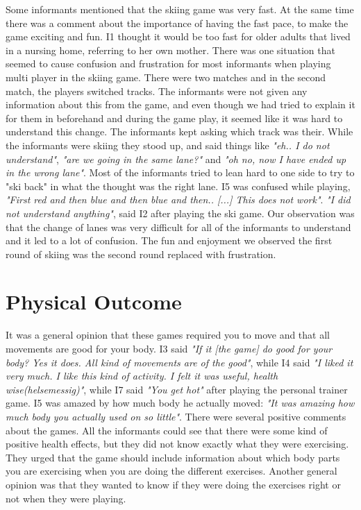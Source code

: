 Some informants mentioned that the skiing game was very fast. At the same time there was a comment about the importance of having the fast pace, to make the game exciting and fun. I1 thought it would be too fast for older adults that lived in a nursing home, referring to her own mother. There was one situation that seemed to cause confusion and frustration for most informants when playing multi player in the skiing game. There were two matches and in the second match, the players switched tracks. The informants were not given any information about this from the game, and even though we had tried to explain it for them in beforehand and during the game play, it seemed like it was hard to understand this change. The informants kept asking which track was their. While the informants were skiing they stood up, and said things like \emph{"eh.. I do not understand"}, \emph{"are we going in the same lane?"} and \emph{"oh no, now I have ended up in the wrong lane"}. Most of the informants tried to lean hard to one side to try to "ski back" in what the thought was the right lane. I5 was confused while playing, \emph{"First red and then blue and then blue and then.. [...] This does not work"}. \emph{"I did not understand anything"}, said I2 after playing the ski game. Our observation was that the change of lanes was very difficult for all of the informants to understand and it led to a lot of confusion. The fun and enjoyment we observed the first round of skiing was the second round replaced with frustration. 

\section{Physical Outcome}

It was a general opinion that these games required you to move and that all movements are good for your body. I3 said \emph{"If it [the game] do good for your body? Yes it does. All kind of movements are of the good"}, while I4 said  \emph{"I liked it very much. I like this kind of activity. I felt it was useful, health wise(helsemessig)"}, while I7 said \emph{"You get hot"} after playing the personal trainer game. I5 was amazed by how much body he actually moved: \emph{"It was amazing how much body you actually used on so little"}. There were several positive comments about the games. All the informants could see that there were some kind of positive health effects, but they did not know exactly what they were exercising. They urged that the game should include information about which body parts you are exercising when you are doing the different exercises. Another general opinion was that they wanted to know if they were doing the exercises right or not when they were playing. 

